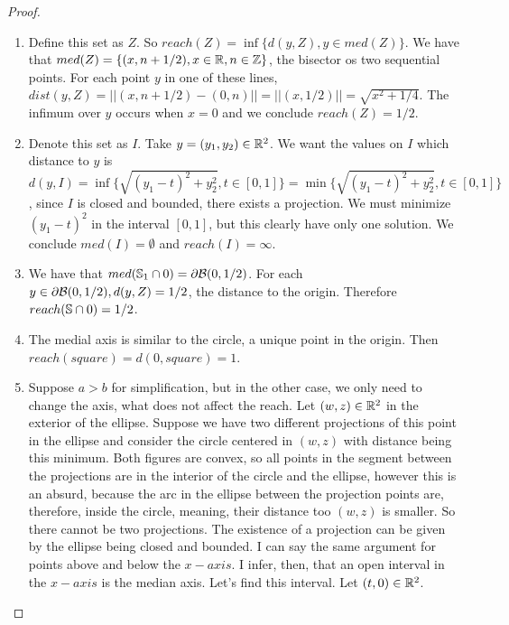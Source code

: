 \begin{proof}

\begin{enumerate}
    \item Define this set as $Z$. So $reach(Z) = \inf\{d(y,Z), y \in
    med(Z)\}$. We have that $med(Z) = \{(x,n+1/2), x \in \mathbb{R}, n \in \mathbb{Z}\}$, the
    bisector os two sequential points. For each point $y$ in one of these
    lines, $dist(y,Z) = ||(x,n+1/2) - (0,n)|| = ||(x,1/2)|| = \sqrt{x^2 +
    1/4}$. The infimum over $y$ occurs when $x = 0$ and we conclude $reach(Z)
    = 1/2$. 

    \item Denote this set as $I$. Take $y = (y_1, y_2) \in \mathbb{R}^2$. We want
    the values on $I$ which distance to $y$ is $d(y,I) = \inf\{\sqrt{(y_1 -
    t)^2 + y_2^2}, t \in [0,1] \} = \min\{\sqrt{(y_1 -
    t)^2 + y_2^2}, t \in [0,1] \}$, since $I$ is closed and bounded, there exists a projection. We must
    minimize $(y_1 - t)^2$ in the interval $[0,1]$, but this clearly have only
    one solution. We conclude $med(I) = \emptyset$ and $reach(I) = \infty$. 
    
    \item We have that $med(\mathbb{S}_1 \cap 0) = \partial\mathcal{B}(0,1/2)$. For each
    $y \in \partial\mathcal{B}(0,1/2), d(y,Z) = 1/2$, the distance to the origin.
    Therefore $reach(\mathbb{S} \cap 0) = 1/2$. 

    \item The medial axis is similar to the circle, a unique point in the
    origin. Then $reach(square) = d(0,square) = 1$. 

    \item Suppose $a > b$ for simplification, but in the other  case, we only
    need to change the axis, what does not affect the reach. Let $(w,z) \in \mathbb{R}^2$ in the exterior of the ellipse. Suppose we have
    two different projections of this point in the ellipse and consider the
    circle centered in $(w,z)$ with distance being this minimum. Both figures
    are convex, so all points in the segment between the projections are in
    the interior of the circle and the ellipse, however this is an absurd, because
    the arc in the ellipse between the projection points are,
    therefore, inside the circle, meaning, their distance too $(w,z)$ is smaller.
    So there cannot be two projections. The existence of a projection can be
    given by the ellipse being closed and bounded. I can say the same argument
    for points above and below the $x-axis$. I infer, then, that an open
    interval in the $x-axis$ is the median axis. Let's find this interval. Let
    $(t,0) \in \mathbb{R}^2$. 


\end{enumerate}
\end{proof}
